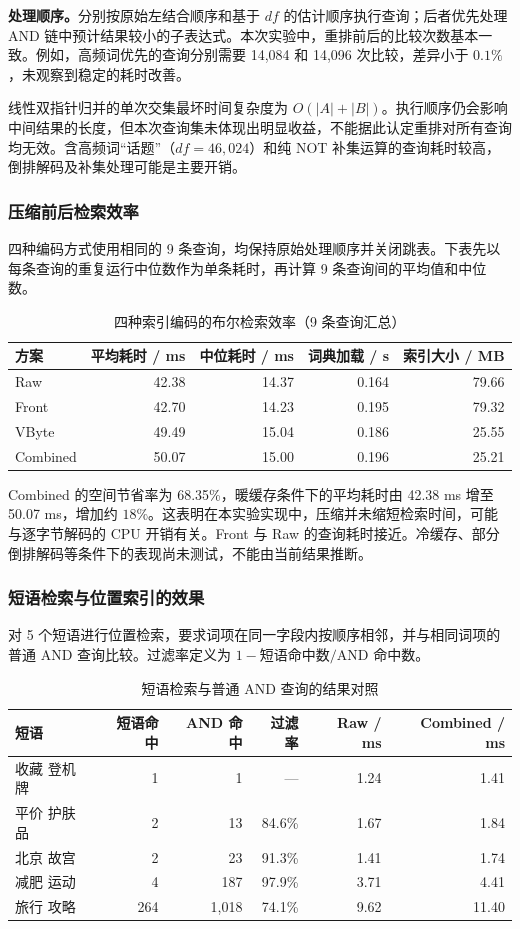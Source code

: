 \documentclass[UTF8,a4paper,11pt,fontset=fandol]{ctexart}
\begin{document}
\noindent\textbf{处理顺序。}分别按原始左结合顺序和基于 \(df\) 的估计顺序执行查询；后者优先处理 AND 链中预计结果较小的子表达式。本次实验中，重排前后的比较次数基本一致。例如，高频词优先的查询分别需要 14,084 和 14,096 次比较，差异小于 \(0.1\%\)，未观察到稳定的耗时改善。

线性双指针归并的单次交集最坏时间复杂度为 \(O(|A|+|B|)\)。执行顺序仍会影响中间结果的长度，但本次查询集未体现出明显收益，不能据此认定重排对所有查询均无效。含高频词“话题”（\(df=46{,}024\)）和纯 NOT 补集运算的查询耗时较高，倒排解码及补集处理可能是主要开销。

\subsubsection{压缩前后检索效率}
四种编码方式使用相同的 9 条查询，均保持原始处理顺序并关闭跳表。下表先以每条查询的重复运行中位数作为单条耗时，再计算 9 条查询间的平均值和中位数。

\begin{table}[H]
\centering\small
\caption{四种索引编码的布尔检索效率（9 条查询汇总）}
\begin{tabular}{@{}lrrrr@{}}\toprule
方案 & 平均耗时 / ms & 中位耗时 / ms & 词典加载 / s & 索引大小 / MB \\ \midrule
Raw & 42.38 & 14.37 & 0.164 & 79.66 \\
Front & 42.70 & 14.23 & 0.195 & 79.32 \\
VByte & 49.49 & 15.04 & 0.186 & 25.55 \\
Combined & 50.07 & 15.00 & 0.196 & 25.21 \\
\bottomrule\end{tabular}
\end{table}

Combined 的空间节省率为 68.35\%，暖缓存条件下的平均耗时由 42.38 ms 增至 50.07 ms，增加约 \(18\%\)。这表明在本实验实现中，压缩并未缩短检索时间，可能与逐字节解码的 CPU 开销有关。Front 与 Raw 的查询耗时接近。冷缓存、部分倒排解码等条件下的表现尚未测试，不能由当前结果推断。

\subsubsection{短语检索与位置索引的效果}
对 5 个短语进行位置检索，要求词项在同一字段内按顺序相邻，并与相同词项的普通 AND 查询比较。过滤率定义为 \(1-\text{短语命中数}/\text{AND 命中数}\)。

\begin{table}[H]
\centering\small
\caption{短语检索与普通 AND 查询的结果对照}
\begin{tabular}{@{}lrrrrr@{}}\toprule
短语 & 短语命中 & AND 命中 & 过滤率 & Raw / ms & Combined / ms \\ \midrule
收藏 登机牌 & 1 & 1 & --- & 1.24 & 1.41 \\
平价 护肤品 & 2 & 13 & 84.6\% & 1.67 & 1.84 \\
北京 故宫 & 2 & 23 & 91.3\% & 1.41 & 1.74 \\
减肥 运动 & 4 & 187 & 97.9\% & 3.71 & 4.41 \\
旅行 攻略 & 264 & 1,018 & 74.1\% & 9.62 & 11.40 \\
\bottomrule\end{tabular}
\end{table}
\end{document}
